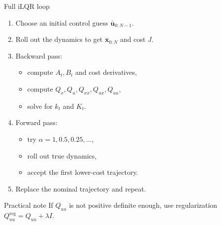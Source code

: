 \documentclass[aspectratio=169]{beamer}
\begin{document}
\begin{frame}[t]{Full iLQR loop}
\small

\begin{enumerate}
    \item Choose an initial control guess $\bar{\bm{u}}_{0:N-1}$.
    \item Roll out the dynamics to get $\bar{\bm{x}}_{0:N}$ and cost $J$.
    \item Backward pass:
    \begin{itemize}
        \item compute $A_t,B_t$ and cost derivatives,
        \item compute $Q_x,Q_u,Q_{xx},Q_{ux},Q_{uu}$,
        \item solve for $k_t$ and $K_t$.
    \end{itemize}
    \item Forward pass:
    \begin{itemize}
        \item try $\alpha=1,0.5,0.25,\ldots$,
        \item roll out true dynamics,
        \item accept the first lower-cost trajectory.
    \end{itemize}
    \item Replace the nominal trajectory and repeat.
\end{enumerate}

\begin{block}{Practical note}
If $Q_{uu}$ is not positive definite enough, use regularization
$Q_{uu}^{\mathrm{reg}}=Q_{uu}+\lambda I$.
\end{block}

\end{frame}
\end{document}
